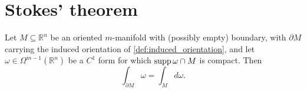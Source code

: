 

\section{Stokes' theorem}
\label{sec:stokes_general}

\begin{theorem}
\label{thm:stokes_general}
Let $M \subseteq \mathbb{R}^n$ be an oriented $m$-manifold with (possibly empty) boundary, with
$\partial M$ carrying the induced orientation of \cref{def:induced_orientation}, and let
$\omega \in \Omega^{m-1}(\mathbb{R}^n)$ be a $C^1$ form for which
$\operatorname{supp}\omega \cap M$ is compact. Then
\[\int_{\partial M} \omega = \int_M d\omega.\]
\end{theorem}

